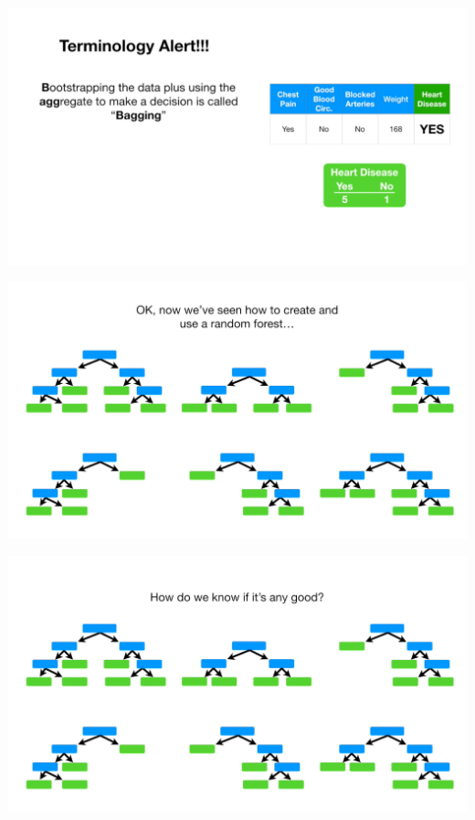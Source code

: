 \documentclass[
  ignorenonframetext,
]{beamer}
\begin{document}
\begin{frame}{}
\protect\hypertarget{section-62}{}
\includegraphics{images/r63.png}
\end{frame}

\begin{frame}{}
\protect\hypertarget{section-63}{}
\includegraphics{images/r64.png}
\end{frame}

\begin{frame}{}
\protect\hypertarget{section-64}{}
\includegraphics{images/r65.png}
\end{frame}
\end{document}

